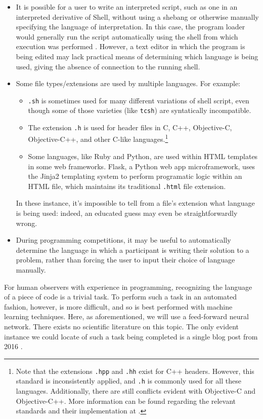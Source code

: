 \documentclass{article}
\begin{document}
\begin{itemize}
  \item{It is possible for a user to write an interpreted script, such as one in an interpreted derivative of Shell, without using a shebang or otherwise manually specifying the language of interpretation. In this case, the program loader would generally run the script automatically using the shell from which execution was performed \cite{shebang}. However, a text editor in which the program is being edited may lack practical means of determining which language is being used, giving the absence of connection to the running shell.}
  \item{Some file types/extensions are used by multiple languages. For example:
  \begin{itemize}
    \item{\texttt{.sh} is sometimes used for many different variations of shell script, even though some of those varieties (like \texttt{tcsh}) are syntatically incompatible.}
    \item{The extension \texttt{.h} is used for header files in C, C++, Objective-C, Objective-C++, and other C-like languages.\footnote{Note that the extensions \texttt{.hpp} and \texttt{.hh} exist for C++ headers. However, this standard is inconsistently applied, and \texttt{.h} is commonly used for all these languages. Additionally, there are still conflicts evident with Objective-C and Objective-C++. More information can be found regarding the relevant standards and their implementation at \cite{atomh}.}}
    \item{Some languages, like Ruby and Python, are used within HTML templates in some web frameworks. Flask, a Python web app microframework, uses the Jinja2 templating system to perform programatic logic within an HTML file, which maintains its traditional \texttt{.html} file extension.}
  \end{itemize}
  In these instance, it's impossible to tell from a file's extension what language is being used: indeed, an educated guess may even be straightforwardly wrong.}
  \item{During programming competitions, it may be useful to automatically determine the language in which a participant is writing their solution to a problem, rather than forcing the user to input their choice of language manually.}
\end{itemize}
For human observers with experience in programming, recognizing the language of a piece of code is a trivial task. To perform such a task in an automated fashion, however, is more difficult, and so is best performed with machine learning techniques. Here, as aforementioned, we will use a feed-forward neural network. There exists no scientific literature on this topic. The only evident instance we could locate of such a task being completed is a single blog post from 2016 \cite{proglangidmedium}.
\end{document}
